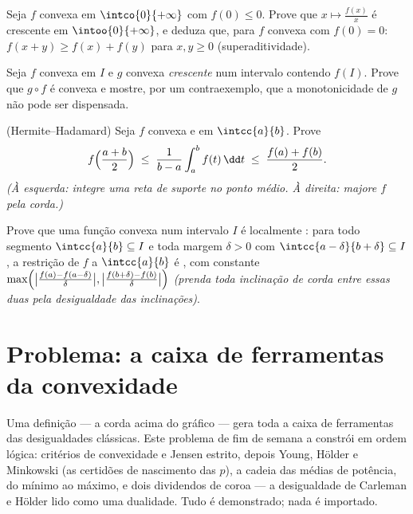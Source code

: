 \begin{exercise}[$\star\star\star$]\label{exo:b2:realfun:9}
Seja $f$ convexa em $\intco{0}{+\infty}$ com $f(0) \leq 0$. Prove
que $x \mapsto \frac{f(x)}{x}$ é crescente em
$\intoo{0}{+\infty}$, e deduza que, para $f$ convexa com $f(0) =
0$: $f(x + y) \geq f(x) + f(y)$ para $x, y \geq 0$
(superaditividade).
\end{exercise}

\begin{exercise}[$\star$]\label{exo:b2:realfun:10}
Seja $f$ convexa em $I$ e $g$ convexa \emph{crescente} num
intervalo contendo $f(I)$. Prove que $g \circ f$ é convexa e
mostre, por um contraexemplo, que a monotonicidade de $g$ não pode ser
dispensada.
\end{exercise}

\begin{exercise}[$\star\star$]\label{exo:b2:realfun:11}
(Hermite--Hadamard) Seja $f$ convexa e  em
$\intcc{a}{b}$. Prove
\[
f\Bigl(\frac{a+b}{2}\Bigr) \;\leq\; \frac{1}{b -
a}\int_a^b f(t)\,\dd t \;\leq\; \frac{f(a) + f(b)}{2} .
\]
\emph{(À esquerda: integre uma reta de suporte no ponto médio. À direita:
majore $f$ pela corda.)}
\end{exercise}

\begin{exercise}[$\star\star\star$]\label{exo:b2:realfun:12}
Prove que uma função convexa num intervalo \emph{} $I$ é
localmente : para todo segmento $\intcc{a}{b} \subseteq I$
e toda margem $\delta > 0$ com $\intcc{a - \delta}{b + \delta}
\subseteq I$, a restrição de $f$ a $\intcc{a}{b}$ é
, com constante
$\max\Bigl(\bigl|\frac{f(a) - f(a - \delta)}{\delta}\bigr|,
\bigl|\frac{f(b + \delta) - f(b)}{\delta}\bigr|\Bigr)$
\emph{(prenda toda inclinação de corda entre essas duas pela desigualdade
das inclinações)}.
\end{exercise}

\section{Problema: a caixa de ferramentas da convexidade}

Uma definição --- a corda acima do gráfico --- gera toda a
caixa de ferramentas das desigualdades clássicas. Este problema de fim de semana
a constrói em ordem lógica: critérios de convexidade e Jensen estrito,
depois Young, Hölder e Minkowski (as certidões de nascimento das
 $p$), a cadeia  das médias de potência, do mínimo ao
máximo, e dois dividendos de coroa --- a desigualdade de Carleman e
Hölder lido como uma dualidade. Tudo é demonstrado; nada é
importado.

